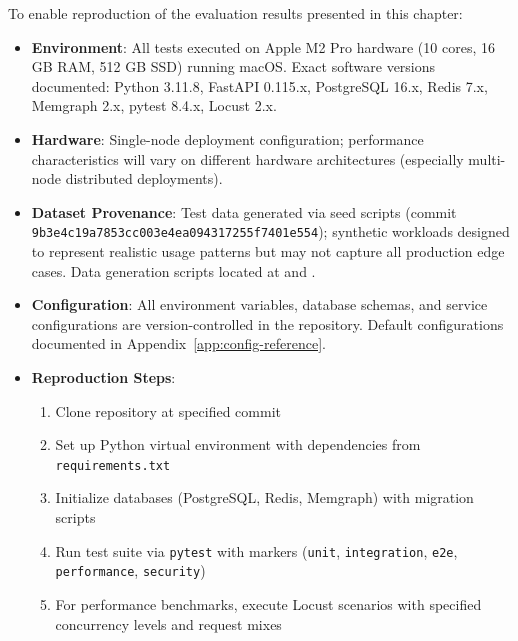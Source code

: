 \documentclass[a4paper,twoside]{sapthesis}
\begin{document}
To enable reproduction of the evaluation results presented in this chapter:

\begin{itemize}
    \item \textbf{Environment}: All tests executed on Apple M2 Pro hardware (10 cores, 16 GB RAM, 512 GB SSD) running macOS. Exact software versions documented: Python 3.11.8, FastAPI 0.115.x, PostgreSQL 16.x, Redis 7.x, Memgraph 2.x, pytest 8.4.x, Locust 2.x.
    \item \textbf{Hardware}: Single-node deployment configuration; performance characteristics will vary on different hardware architectures (especially multi-node distributed deployments).
    \item \textbf{Dataset Provenance}: Test data generated via seed scripts (commit \texttt{9b3e4c19a7853cc003e4ea094317255f7401e554}); synthetic workloads designed to represent realistic usage patterns but may not capture all production edge cases. Data generation scripts located at  and .
    \item \textbf{Configuration}: All environment variables, database schemas, and service configurations are version-controlled in the repository. Default configurations documented in Appendix~\ref{app:config-reference}.
    \item \textbf{Reproduction Steps}: 
    \begin{enumerate}
        \item Clone repository at specified commit
        \item Set up Python virtual environment with dependencies from \texttt{requirements.txt}
        \item Initialize databases (PostgreSQL, Redis, Memgraph) with migration scripts
        \item Run test suite via \texttt{pytest} with markers (\texttt{unit}, \texttt{integration}, \texttt{e2e}, \texttt{performance}, \texttt{security})
        \item For performance benchmarks, execute Locust scenarios with specified concurrency levels and request mixes
    \end{enumerate}
\end{itemize}


\end{document}
